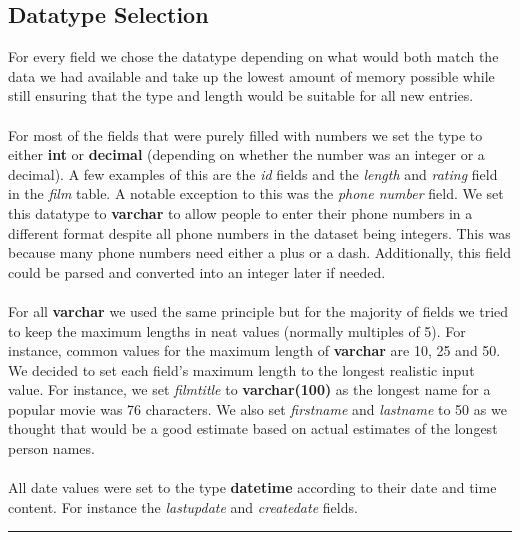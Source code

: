 \documentclass[openany]{article}
\begin{document}
\subsection{Datatype Selection}
	For every field we chose the datatype depending on what would both match the data we had available and take up the lowest amount of memory possible 
	while still ensuring that the type and length would be suitable for all new entries. 
	\\\\
	For most of the fields that were purely filled with numbers we set the type to either \textbf{int} or \textbf{decimal} (depending on whether the number was an integer 
	or a decimal). A few examples of this are the \emph{id} fields and the \emph{length} and \emph{rating} field in the \emph{film} table. A notable exception to this was the 
	\emph{phone number} field. We set this datatype to \textbf{varchar} to allow people to enter their phone numbers in a different format despite all phone numbers in the 
	dataset being integers. This was because many phone numbers need either a plus or a dash. Additionally, this field could be parsed and converted into an integer later if needed.
	\\\\	
	For all \textbf{varchar} we used the same principle but for the majority of fields we tried to keep the maximum lengths in neat values (normally multiples of 5). For instance, common 
	values for the maximum length of \textbf{varchar} are 10, 25 and 50. We decided to set each field’s maximum length to the longest realistic input value.
	For instance, we set \emph{film\textunderscore title} to \textbf{varchar(100)} as the longest name for a popular movie was 76 characters. We also set \emph{first\textunderscore name} and 
	\emph{last\textunderscore name} to 50 as we thought that would be a good estimate based on actual estimates of the longest person names.
	\\\\
	All date values were set to the type \textbf{datetime} according to their date and time content. For instance the \emph{last\textunderscore update} and
	\emph{create\textunderscore date} fields.	
	\\
	\rule{\textwidth}{0.4pt}
	
\end{document}
